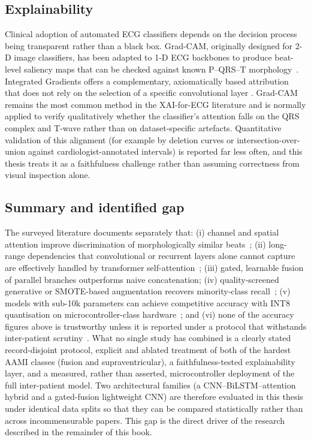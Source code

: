 \subsection{Explainability}

Clinical adoption of automated ECG classifiers depends on the decision
process being transparent rather than a black box. Grad-CAM, originally
designed for 2-D image classifiers, has been adapted to 1-D ECG backbones to
produce beat-level saliency maps that can be checked against known
P--QRS--T morphology~\cite{selvaraju2017gradcam}. Integrated Gradients
offers a complementary, axiomatically based attribution that does not rely
on the selection of a specific convolutional layer
\cite{sundararajan2017integrated}. Grad-CAM remains the most common method
in the XAI-for-ECG literature and is normally applied to verify
qualitatively whether the classifier's attention falls on the QRS complex
and T-wave rather than on dataset-specific artefacts. Quantitative
validation of this alignment (for example by deletion curves or
intersection-over-union against cardiologist-annotated intervals) is
reported far less often, and this thesis treats it as a faithfulness
challenge rather than assuming correctness from visual inspection alone.

\subsection{Summary and identified gap}

The surveyed literature documents separately that: (i) channel and spatial
attention improve discrimination of morphologically similar
beats~\cite{hu2018squeeze,zhang2020seecgnet,xu2022racnn,zheng2025multiinput};
(ii) long-range dependencies that convolutional or recurrent layers alone
cannot capture are effectively handled by transformer
self-attention~\cite{islam2024,xia2023transformer,anjum2023temporal,vaswani2017attention};
(iii) gated, learnable fusion of parallel branches outperforms naive
concatenation; (iv) quality-screened generative or SMOTE-based augmentation
recovers minority-class recall~\cite{chawla2002smote}; (v) models with
sub-10k parameters can achieve competitive accuracy with INT8 quantisation
on microcontroller-class hardware~\cite{busia2024tinytransformer,zambrano2026tinyml};
and (vi) none of the accuracy figures above is trustworthy unless it is
reported under a protocol that withstands inter-patient
scrutiny~\cite{silva2025systematic,xiao2023systematic,dechazal2004}. What no
single study has combined is a clearly stated record-disjoint protocol,
explicit and ablated treatment of both of the hardest AAMI classes (fusion
and supraventricular), a faithfulness-tested explainability layer, and a
measured, rather than asserted, microcontroller deployment of the full
inter-patient model. Two architectural families (a CNN--BiLSTM--attention
hybrid and a gated-fusion lightweight CNN) are therefore evaluated in this
thesis under identical data splits so that they can be compared
statistically rather than across incommensurable papers. This gap is the
direct driver of the research described in the remainder of this book.


